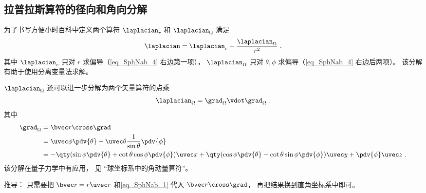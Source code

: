 \subsection{拉普拉斯算符的径向和角向分解}
为了书写方便小时百科中定义两个算符 $\laplacian_r$ 和 $\laplacian_\Omega$ 满足
\begin{equation}\label{eq_SphNab_3}
\laplacian = \laplacian_r + \frac{\laplacian_\Omega}{r^2}~.
\end{equation}
其中 $\laplacian_r$ 只对 $r$ 求偏导（\autoref{eq_SphNab_4} 右边第一项）， $\laplacian_\Omega$ 只对 $\theta,\phi$ 求偏导（\autoref{eq_SphNab_4} 右边后两项）。 该分解有助于使用分离变量法求解。

$\laplacian_\Omega$ 还可以进一步分解为两个矢量算符的点乘
\begin{equation}
\laplacian_\Omega = \grad_\Omega\vdot \grad_\Omega~.
\end{equation}
其中
\begin{equation}
\begin{aligned}
\grad_\Omega &= \bvec r \cross \grad\\
&= \uvec \phi \pdv{\theta} - \uvec \theta\frac{1}{\sin\theta} \pdv{\phi}\\
&= -\qty(\sin\phi\pdv{\theta} + \cot\theta\cos\phi\pdv{\phi})\uvec x
+ \qty(\cos\phi\pdv{\theta} - \cot\theta \sin\phi \pdv{\phi}) \uvec y
+ \pdv{\phi} \uvec z~.
\end{aligned}
\end{equation}
该分解在量子力学中有应用， 见 “球坐标系中的角动量算符”。

推导： 只需要把 $\bvec r = r \uvec r$ 和\autoref{eq_SphNab_1} 代入 $\bvec r \cross \grad$， 再把结果换到直角坐标系中即可。

